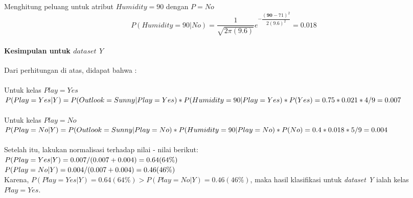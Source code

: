 	Menghitung peluang untuk atribut $Humidity=90$ dengan $P=No$
		\begin{equation}
			P(Humidity=90|No)
			= \dfrac{1}{\sqrt{2\pi(9.6)}}e^{-\dfrac{(\textbf{90}-71)^2}{2(9.6)^2}} 
			= 0.018
		\end{equation}
		
	\paragraph{Kesimpulan untuk $dataset$ $Y$}
	Dari perhitungan di atas, didapat bahwa : \\ \\
	Untuk kelas $Play=Yes$ \\
	$P(Play=Yes|Y) \\
	= P(Outlook=Sunny|Play=Yes)*P(Humidity=90|Play=Yes)*P(Yes) \\
	= 0.75 * 0.021 * 4/9 \\
	= 0.007$ \\ \\
	Untuk kelas $Play=No$ \\
	$P(Play=No|Y) \\
	= P(Outlook=Sunny|Play=No)*P(Humidity=90|Play=No)*P(No) \\
	= 0.4 * 0.018 * 5/9 \\
	= 0.004$ \\ \\
	Setelah itu, lakukan normalisasi terhadap nilai - nilai berikut: \\
	$P(Play=Yes|Y) = 0.007 / (0.007+0.004) \\
	= 0.64 (64\%)$ \\
	$P(Play=No|Y) = 0.004 / (0.007+0.004) \\
	= 0.46 (46\%)$ \\
	
	Karena, $P(Play=Yes|Y) = 0.64 (64\%) > P(Play=No|Y) = 0.46 (46\%)$, maka hasil klasifikasi untuk \textit{dataset Y} ialah kelas $Play=Yes$.
	


